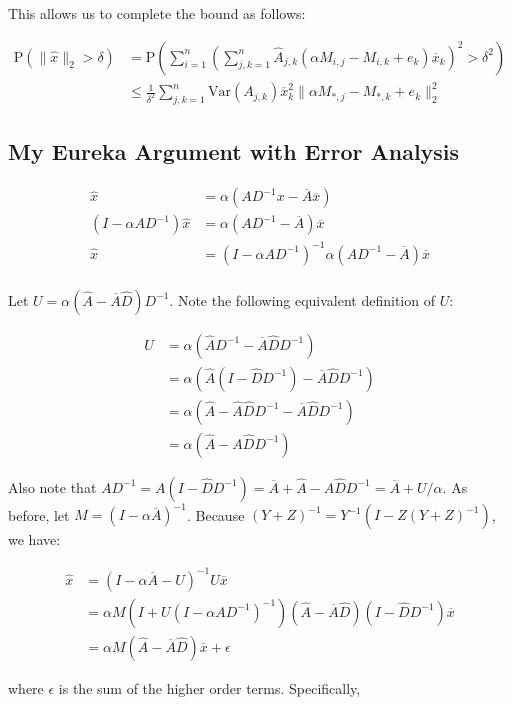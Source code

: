 \documentclass{article}
\newcommand \Var[1] {\mathrm {Var} \left(#1\right)} %
\newcommand \p[1] {\mathrm P \left(#1\right)}
\newcommand \inv [1] {{#1}^{-1}} %
\begin{document}
This allows us to complete the bound as follows:

\begin{align*}
\p{\|\hat x\|_2>\delta} &= \p{\sum_{i=1}^n \left(\sum_{j,k=1}^n \hat A_{j,k}(\alpha M_{i,j} - M_{i,k} + e_k) \overline x_k\right)^2 > \delta^2} \\
&\leq \frac 1 {\delta^2} \sum_{j,k=1}^n \Var{A_{j,k}} \overline x_k^2 \| \alpha M_{*,j} - M_{*,k} + e_k \|_2^2
\end{align*}

\subsection{My Eureka Argument with Error Analysis}

\begin{align*}
\hat x &= \alpha(A\inv D x - \overline A\overline x) \\
(I-\alpha A\inv D)\hat x &= \alpha(A\inv D-\overline A)\overline x \\
\hat x &= (I-\alpha A\inv D)^{-1} \alpha(A\inv D-\overline A)\overline x \\
\end{align*}

Let $U=\alpha(\hat A-\overline A\hat D)\inv D$. Note the following equivalent definition of $U$:

\begin{align*}
U &= \alpha(\hat A\inv D - \overline A\hat D\inv D) \\
&= \alpha(\hat A(I-\hat D\inv D) - \overline A\hat D\inv D) \\
&= \alpha(\hat A - \hat A\hat D\inv D - \overline A\hat D\inv D) \\
&= \alpha(\hat A - A\hat D\inv D)
\end{align*}

Also note that $A\inv D = A(I-\hat D\inv D) = \overline A + \hat A - A\hat D\inv D = \overline A + U/\alpha$. As before, let $M=(I-\alpha\overline A)^{-1}$. Because $(Y+Z)^{-1}=\inv Y\left(I - Z (Y+Z)^{-1}\right)$, we have:

\begin{align*}
\hat x &= (I-\alpha\overline A - U)^{-1} U\overline x \\
&= \alpha M(I+U(I-\alpha A\inv D)^{-1})(\hat A-\overline A\hat D)(I-\hat D\inv D)\overline x \\
&= \alpha M(\hat A-\overline A\hat D)\overline x + \epsilon
\end{align*}

where $\epsilon$ is the sum of the higher order terms. Specifically,
\end{document}
